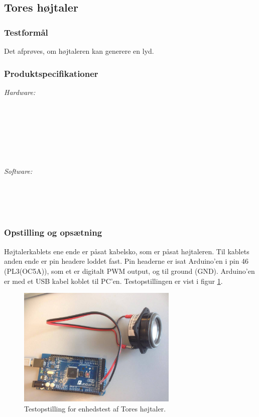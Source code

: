 	\subsection{Tores højtaler}
		\subsubsection{Testformål}
		Det afprøves, om højtaleren kan generere en lyd.
		\subsubsection{Produktspecifikationer}
	
	
		\textit{Hardware:}\\
		\tores\\
		\hojtalerkabel\\
		\kabelsko\\
		\pins\\
		\arduino\\
		\PC\\
		\usbkabel\\
	
		\textit{Software:}\\
		\labview\\
		\visa\\
		\vi\\
		\ardsw\
	
		\subsubsection{Opstilling og opsætning}
		Højtalerkablets ene ende er påsat kabelsko, som er påsat højtaleren. Til kablets anden ende er pin headere loddet fast. Pin headerne er isat Arduino'en i pin 46 (PL3(OC5A)), som et er digitalt PWM output, og til ground (GND). 
		Arduino'en er med et USB kabel koblet til PC'en. Testopstillingen er vist i figur \ref{fig:ethb}.\\ 
	  
			\begin{figure}[htb]
			\centering
				\includegraphics[width=3in]{hbArduino}
				\caption{Testopstilling for enhedstest af Tores højtaler.}	
				\label{fig:ethb}
			\end{figure}
	

